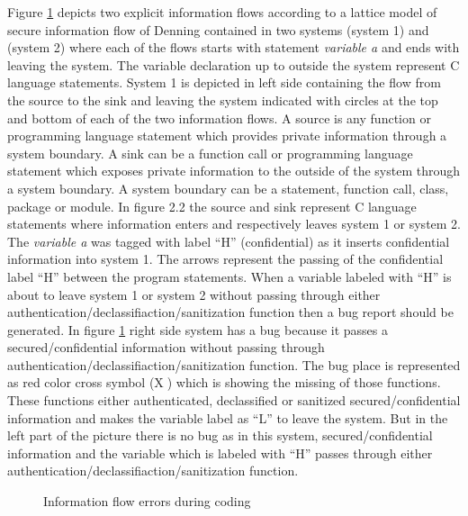 Figure \ref{figure_bug_detection_during_coding} depicts two explicit information flows according to a lattice model of secure information flow of Denning \cite{ref_14_denning1976lattice} contained in two systems (system 1) and (system 2)
where each of the flows starts with statement \emph{variable a} and ends with leaving the system. The variable declaration up to outside the system represent C language statements. System 1 is depicted in left side containing the flow from the source to the sink and leaving the system indicated with circles at the top and bottom of each of the
two information flows. A source is any function or programming language statement which provides private information through a system boundary. A sink can be a function call or programming language statement which exposes private information to the outside of the system through a system boundary. A system boundary can be a statement, function call, class, package or module. In figure 2.2 the source and sink represent C language statements where information enters and respectively leaves system 1 or system 2. The \emph{ variable a} was tagged with label \enquote{H} (confidential) as it inserts confidential information into system 1. The arrows represent the passing of the confidential label \enquote{H} between the program statements. When a variable labeled with \enquote{H} is about to leave system 1 or system 2 without passing through either authentication/declassifiaction/sanitization function then a bug report should be generated. In figure \ref{figure_bug_detection_during_coding} right side system has a bug because it passes a secured/confidential information without passing through authentication/declassifiaction/sanitization function. The bug place is represented as red color cross symbol (\textcircled{X}) which is showing the missing of those functions. These functions either authenticated, declassified or sanitized  secured/confidential information and makes the variable label as \enquote{L} to leave the system. But in the left part of the picture there is no bug as in this system, secured/confidential information and the variable which is labeled with \enquote{H} passes through either authentication/declassifiaction/sanitization function.

\begin{figure}[htbp]
	\centering
	\caption{Information flow errors during coding}
	\label{figure_bug_detection_during_coding}
\end{figure}
